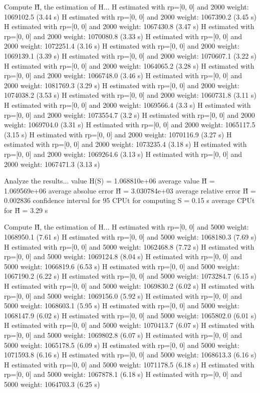 Compute H̃, the estimation of H...
  H estimated with rp=[0, 0] and 2000 weight:  1069102.5  (3.44 s)
  H estimated with rp=[0, 0] and 2000 weight:  1067390.2  (3.45 s)
  H estimated with rp=[0, 0] and 2000 weight:  1067430.8  (3.47 s)
  H estimated with rp=[0, 0] and 2000 weight:  1070080.8  (3.33 s)
  H estimated with rp=[0, 0] and 2000 weight:  1072251.4  (3.16 s)
  H estimated with rp=[0, 0] and 2000 weight:  1069139.1  (3.39 s)
  H estimated with rp=[0, 0] and 2000 weight:  1070607.1  (3.22 s)
  H estimated with rp=[0, 0] and 2000 weight:  1064065.2  (3.28 s)
  H estimated with rp=[0, 0] and 2000 weight:  1066748.0  (3.46 s)
  H estimated with rp=[0, 0] and 2000 weight:  1081769.3  (3.29 s)
  H estimated with rp=[0, 0] and 2000 weight:  1074038.2  (3.53 s)
  H estimated with rp=[0, 0] and 2000 weight:  1060731.8  (3.11 s)
  H estimated with rp=[0, 0] and 2000 weight:  1069566.4  (3.3 s)
  H estimated with rp=[0, 0] and 2000 weight:  1073554.7  (3.2 s)
  H estimated with rp=[0, 0] and 2000 weight:  1069704.0  (3.31 s)
  H estimated with rp=[0, 0] and 2000 weight:  1065117.5  (3.15 s)
  H estimated with rp=[0, 0] and 2000 weight:  1070116.9  (3.27 s)
  H estimated with rp=[0, 0] and 2000 weight:  1073235.4  (3.18 s)
  H estimated with rp=[0, 0] and 2000 weight:  1069264.6  (3.13 s)
  H estimated with rp=[0, 0] and 2000 weight:  1067471.3  (3.13 s)

Analyze the results...
  value H(S)                  = 1.068810e+06 
  average value H̃             = 1.069569e+06 
  average absolue error H̃     = 3.030784e+03 
  average relative error H̃    = 0.002836 
  confidence interval for 95%
  CPUt for computing S         = 0.15 s
  average CPUt for H̃           = 3.29 s

Compute H̃, the estimation of H...
  H estimated with rp=[0, 0] and 5000 weight:  1068950.1  (7.61 s)
  H estimated with rp=[0, 0] and 5000 weight:  1068180.3  (7.69 s)
  H estimated with rp=[0, 0] and 5000 weight:  1062468.8  (7.72 s)
  H estimated with rp=[0, 0] and 5000 weight:  1069124.8  (8.04 s)
  H estimated with rp=[0, 0] and 5000 weight:  1066819.6  (6.53 s)
  H estimated with rp=[0, 0] and 5000 weight:  1067190.2  (6.22 s)
  H estimated with rp=[0, 0] and 5000 weight:  1073284.7  (6.15 s)
  H estimated with rp=[0, 0] and 5000 weight:  1069830.2  (6.02 s)
  H estimated with rp=[0, 0] and 5000 weight:  1069156.0  (5.92 s)
  H estimated with rp=[0, 0] and 5000 weight:  1068603.1  (5.95 s)
  H estimated with rp=[0, 0] and 5000 weight:  1068147.9  (6.02 s)
  H estimated with rp=[0, 0] and 5000 weight:  1065802.0  (6.01 s)
  H estimated with rp=[0, 0] and 5000 weight:  1070413.7  (6.07 s)
  H estimated with rp=[0, 0] and 5000 weight:  1069802.8  (6.07 s)
  H estimated with rp=[0, 0] and 5000 weight:  1065178.5  (6.09 s)
  H estimated with rp=[0, 0] and 5000 weight:  1071593.8  (6.16 s)
  H estimated with rp=[0, 0] and 5000 weight:  1068613.3  (6.16 s)
  H estimated with rp=[0, 0] and 5000 weight:  1071178.5  (6.18 s)
  H estimated with rp=[0, 0] and 5000 weight:  1067878.1  (6.18 s)
  H estimated with rp=[0, 0] and 5000 weight:  1064703.3  (6.25 s)


